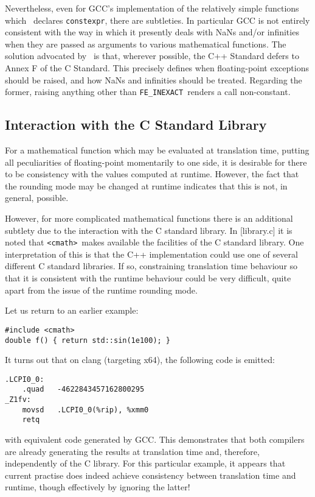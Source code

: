 \documentclass[prd,twocolumn,amsmath,amssymb,nofootinbib,eqsecnum]{revtex4-1}
\newcommand{\constexpr}{\code{constexpr}\xspace}
\newcommand{\code}[1]{{\tt #1}}
\newcommand{\header}[1]{{\tt <#1>}}
\newcommand{\cmath}{\header{cmath}}
\newcommand{\FEINEXACT}{{\tt FE\_INEXACT}}
\begin{document}
Nevertheless, even for GCC's implementation of the relatively simple functions which~\cite{Rosten-constexpr} declares \constexpr, there are subtleties. In particular GCC is not entirely consistent with the way in which it presently deals with NaNs and/or infinities when they are passed as arguments to various mathematical functions. The solution advocated by~\cite{Rosten-constexpr} is that, wherever possible, the C++ Standard defers to Annex F of the C Standard. This precisely defines when floating-point exceptions should be raised, and how NaNs and infinities should be treated. Regarding the former, raising anything other than \FEINEXACT\ renders a call non-constant.

\subsection{Interaction with the C Standard Library}

For a mathematical function which may be evaluated at translation time, 
putting all peculiarities of floating-point momentarily to one side, it is desirable for there to be
consistency with the values computed at runtime. However, the fact that the rounding mode
may be changed at runtime indicates that this is not, in general, possible. 

However, for more complicated mathematical functions there is an additional subtlety due
to the interaction with the C standard library. In [library.c] it is noted that \cmath\ makes available the facilities of the C standard library. One interpretation of this is that the C++
implementation could use one of several different C standard libraries. If so, 
constraining translation time behaviour so that it is consistent with the runtime behaviour
could be very difficult, quite apart from the issue of the runtime rounding mode.

Let us return to an earlier example:
\begin{Verbatim}
#include <cmath>
double f() { return std::sin(1e100); }
\end{Verbatim}
It turns out that on clang (targeting x64), the following code is emitted:
\begin{Verbatim}
.LCPI0_0:
	.quad	-4622843457162800295 
_Z1fv:
	movsd	.LCPI0_0(%rip), %xmm0
	retq
\end{Verbatim}
with equivalent code generated by GCC. This demonstrates that both compilers are already generating the results at translation time and, therefore, independently of the C library. For this particular example, it appears that current practise does indeed achieve consistency between translation time and runtime, though effectively by ignoring the latter!
\end{document}
